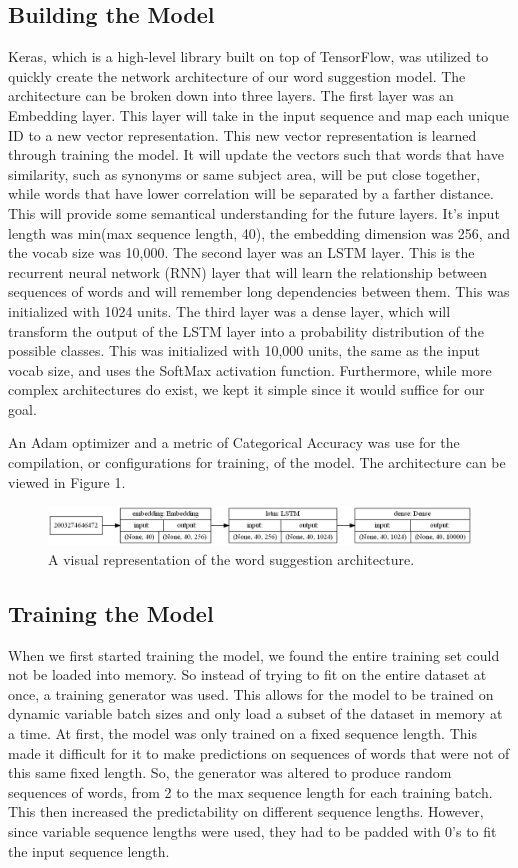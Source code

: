 \documentclass[sigconf]{acmart}
\begin{document}
\subsection{Building the Model}
Keras, which is a high-level library built on top of TensorFlow, was utilized to quickly create the network architecture of our word suggestion model. The architecture can be broken down into three layers. The first layer was an Embedding layer. This layer will take in the input sequence and map each unique ID to a new vector representation. This new vector representation is learned through training the model. It will update the vectors such that words that have similarity, such as synonyms or same subject area, will be put close together, while words that have lower correlation will be separated by a farther distance. This will provide some semantical understanding for the future layers. It’s input length was min(max sequence length, 40), the embedding dimension was 256, and the vocab size was 10,000. The second layer was an LSTM layer. This is the recurrent neural network (RNN) layer that will learn the relationship between sequences of words and will remember long dependencies between them. This was initialized with 1024 units. The third layer was a dense layer, which will transform the output of the LSTM layer into a probability distribution of the possible classes. This was initialized with 10,000 units, the same as the input vocab size, and uses the SoftMax activation function. Furthermore, while more complex architectures do exist, we kept it simple since it would suffice for our goal.

An Adam optimizer and a metric of Categorical Accuracy was use for the compilation, or configurations for training, of the model. The architecture can be viewed in Figure 1.
\begin{figure}[h]
    \centering
    \includegraphics[width=\linewidth, scale=1.5]{figures/model.png}
    \caption{A visual representation of the word suggestion architecture.}
\end{figure}

\subsection{Training the Model}
When we first started training the model, we found the entire training set could not be loaded into memory. So instead of trying to fit on the entire dataset at once, a training generator was used\cite{lstmkeras}. This allows for the model to be trained on dynamic variable batch sizes and only load a subset of the dataset in memory at a time. At first, the model was only trained on a fixed sequence length. This made it difficult for it to make predictions on sequences of words that were not of this same fixed length. So, the generator was altered to produce random sequences of words, from 2 to the max sequence length for each training batch. This then increased the predictability on different sequence lengths. However, since variable sequence lengths were used, they had to be padded with 0’s to fit the input sequence length. 
\end{document}
